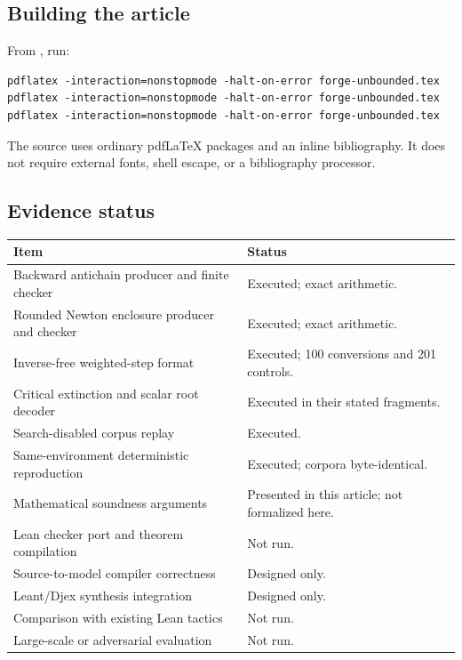 \subsection{Building the article}
From , run:
\begin{lstlisting}
pdflatex -interaction=nonstopmode -halt-on-error forge-unbounded.tex
pdflatex -interaction=nonstopmode -halt-on-error forge-unbounded.tex
pdflatex -interaction=nonstopmode -halt-on-error forge-unbounded.tex
\end{lstlisting}
The source uses ordinary pdfLaTeX packages and an inline bibliography. It does not require external fonts, shell escape, or a bibliography processor.

\subsection{Evidence status}
\begin{longtable}{P{0.43\textwidth}P{0.47\textwidth}}
\toprule
Item & Status \\
\midrule
Backward antichain producer and finite checker & Executed; exact arithmetic.\\
Rounded Newton enclosure producer and checker & Executed; exact arithmetic.\\
Inverse-free weighted-step format & Executed; 100 conversions and 201 controls.\\
Critical extinction and scalar root decoder & Executed in their stated fragments.\\
Search-disabled corpus replay & Executed.\\
Same-environment deterministic reproduction & Executed; corpora byte-identical.\\
Mathematical soundness arguments & Presented in this article; not formalized here.\\
Lean checker port and theorem compilation & Not run.\\
Source-to-model compiler correctness & Designed only.\\
Leant/Djex synthesis integration & Designed only.\\
Comparison with existing Lean tactics & Not run.\\
Large-scale or adversarial evaluation & Not run.\\
\bottomrule
\end{longtable}
